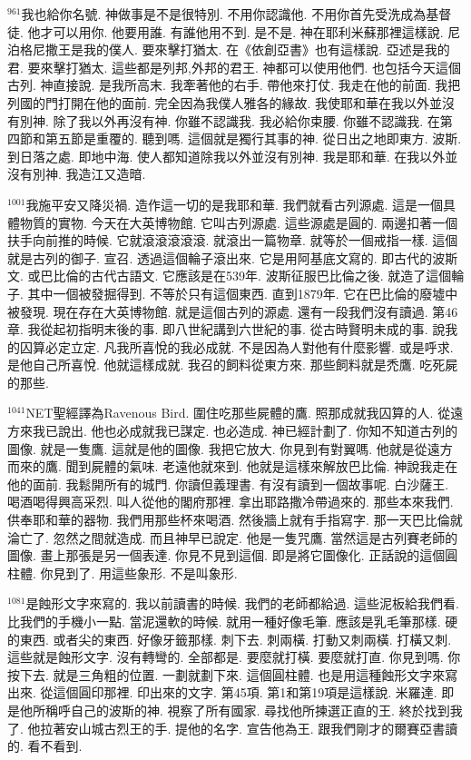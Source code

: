 \documentclass{book}
\begin{document}
$^{961}$我也給你名號.
神做事是不是很特別.
不用你認識他.
不用你首先受洗成為基督徒.
他才可以用你.
他要用誰.
有誰他用不到.
是不是.
神在耶利米蘇那裡這樣說.
尼泊格尼撒王是我的僕人.
要來擊打猶太.
在《依創亞書》也有這樣說.
亞述是我的君.
要來擊打猶太.
這些都是列邦,外邦的君王.
神都可以使用他們.
也包括今天這個古列.
神直接說.
是我所高末.
我牽著他的右手.
帶他來打仗.
我走在他的前面.
我把列國的門打開在他的面前.
完全因為我僕人雅各的緣故.
我使耶和華在我以外並沒有別神.
除了我以外再沒有神.
你雖不認識我.
我必給你束腰.
你雖不認識我.
在第四節和第五節是重覆的.
聽到嗎.
這個就是獨行其事的神.
從日出之地即東方.
波斯.
到日落之處.
即地中海.
使人都知道除我以外並沒有別神.
我是耶和華.
在我以外並沒有別神.
我造江又造暗.

$^{1001}$我施平安又降災禍.
造作這一切的是我耶和華.
我們就看古列源處.
這是一個具體物質的實物.
今天在大英博物館.
它叫古列源處.
這些源處是圓的.
兩邊扣著一個扶手向前推的時候.
它就滾滾滾滾滾.
就滾出一篇物章.
就等於一個戒指一樣.
這個就是古列的御子.
宣召.
透過這個輪子滾出來.
它是用阿基底文寫的.
即古代的波斯文.
或巴比倫的古代古語文.
它應該是在539年.
波斯征服巴比倫之後.
就造了這個輪子.
其中一個被發掘得到.
不等於只有這個東西.
直到1879年.
它在巴比倫的廢墟中被發現.
現在存在大英博物館.
就是這個古列的源處.
還有一段我們沒有讀過.
第46章.
我從起初指明末後的事.
即八世紀講到六世紀的事.
從古時賢明未成的事.
說我的囚算必定立定.
凡我所喜悅的我必成就.
不是因為人對他有什麼影響.
或是呼求.
是他自己所喜悅.
他就這樣成就.
我召的飼料從東方來.
那些飼料就是禿鷹.
吃死屍的那些.

$^{1041}$NET聖經譯為Ravenous Bird.
圍住吃那些屍體的鷹.
照那成就我囚算的人.
從遠方來我已說出.
他也必成就我已謀定.
也必造成.
神已經計劃了.
你知不知道古列的圖像.
就是一隻鷹.
這就是他的圖像.
我把它放大.
你見到有對翼嗎.
他就是從遠方而來的鷹.
聞到屍體的氣味.
老遠他就來到.
他就是這樣來解放巴比倫.
神說我走在他的面前.
我鬆開所有的城門.
你讀但義理書.
有沒有讀到一個故事呢.
白沙薩王.
喝酒喝得興高采烈.
叫人從他的閣府那裡.
拿出耶路撒冷帶過來的.
那些本來我們.
供奉耶和華的器物.
我們用那些杯來喝酒.
然後牆上就有手指寫字.
那一天巴比倫就淪亡了.
忽然之間就造成.
而且神早已說定.
他是一隻咒鷹.
當然這是古列賽老師的圖像.
畫上那張是另一個表達.
你見不見到這個.
即是將它圖像化.
正話說的這個圓柱體.
你見到了.
用這些象形.
不是叫象形.

$^{1081}$是蝕形文字來寫的.
我以前讀書的時候.
我們的老師都給過.
這些泥板給我們看.
比我們的手機小一點.
當泥還軟的時候.
就用一種好像毛筆.
應該是乳毛筆那樣.
硬的東西.
或者尖的東西.
好像牙籤那樣.
刺下去.
刺兩橫.
打動又刺兩橫.
打橫又刺.
這些就是蝕形文字.
沒有轉彎的.
全部都是.
要麼就打橫.
要麼就打直.
你見到嗎.
你按下去.
就是三角粗的位置.
一劃就劃下來.
這個圓柱體.
也是用這種蝕形文字來寫出來.
從這個圓印那裡.
印出來的文字.
第45項.
第1和第19項是這樣說.
米羅達.
即是他所稱呼自己的波斯的神.
視察了所有國家.
尋找他所揀選正直的王.
終於找到我了.
他拉著安山城古烈王的手.
提他的名字.
宣告他為王.
跟我們剛才的爾賽亞書讀的.
看不看到.
\end{document}
